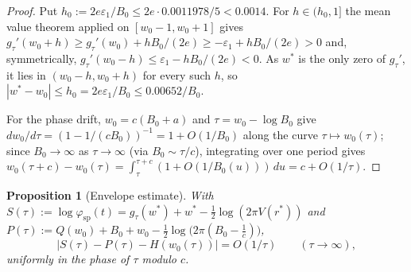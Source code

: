 \documentclass[11pt]{amsart}
\theoremstyle{plain}
\newtheorem{proposition}[theorem]{Proposition}
\theoremstyle{definition}
\theoremstyle{remark}
\begin{document}
\begin{proof}
Put $h_0 := 2e\varepsilon_1/B_0 \le 2e\cdot0.0011978/5 < 0.0014$. For $h\in(h_0,1]$ the mean value
theorem applied on $[w_0-1,w_0+1]$ gives $g_\tau'(w_0+h) \ge g_\tau'(w_0)+hB_0/(2e) \ge
-\varepsilon_1 + hB_0/(2e) > 0$ and, symmetrically, $g_\tau'(w_0-h) \le \varepsilon_1-hB_0/(2e) <
0$. As $w^*$ is the only zero of $g_\tau'$, it lies in $(w_0-h,w_0+h)$ for every such $h$, so
$|w^*-w_0| \le h_0 = 2e\varepsilon_1/B_0 \le 0.00652/B_0$.

For the phase drift, $w_0=c(B_0+a)$ and $\tau=w_0-\log B_0$ give $dw_0/d\tau = (1-1/(cB_0))^{-1} =
1+O(1/B_0)$ along the curve $\tau\mapsto w_0(\tau)$; since $B_0\to\infty$ as $\tau\to\infty$ (via
$B_0\sim\tau/c$), integrating over one period gives $w_0(\tau+c)-w_0(\tau) =
\int_\tau^{\tau+c}(1+O(1/B_0(u)))\,du = c+O(1/\tau)$.
\end{proof}

\begin{proposition}[Envelope estimate]
\label{prop:envelope}
With $S(\tau) := \log\varphi_{\mathrm{sp}}(t) = g_\tau(w^*)+w^*-\tfrac12\log(2\pi V(r^*))$ and
$P(\tau) := Q(w_0)+B_0+w_0-\tfrac12\log\bigl(2\pi(B_0-\tfrac1c)\bigr)$,
\[
|S(\tau) - P(\tau) - H(w_0(\tau))| = O(1/\tau) \qquad (\tau\to\infty),
\]
uniformly in the phase of $\tau$ modulo $c$.
\end{proposition}
\end{document}
